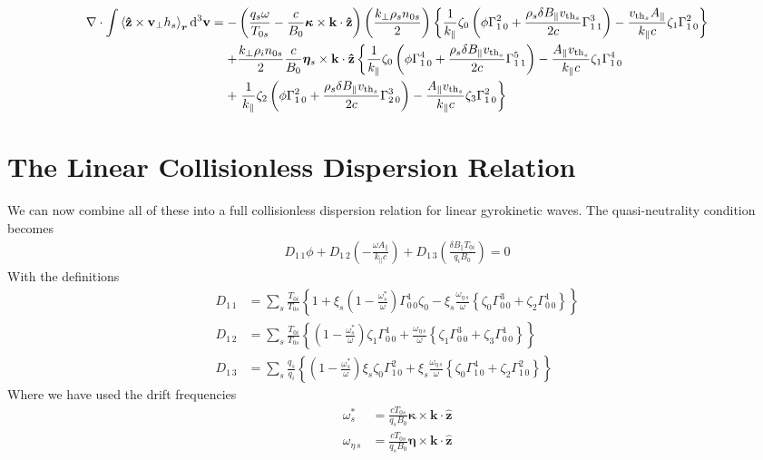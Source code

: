 \documentclass[prb,aps,amssymb,amsmath,a4paper]{revtex4}
\begin{document}
\begin{align}
\nonumber
\nabla\cdot\int {\left< \mathbf{\hat{z}}\times\mathbf{v}_\perp h_s \right>}_{\bm{r}}\,\mathrm{d}^3\mathbf{v}= -& \left(\frac{q_s\omega}{T_{0s}} - \frac{c}{B_0} \bm{\kappa}\times\mathbf{k}\cdot\mathbf{\hat{z}}\right)\left(\frac{k_\perp \rho_s n_{0s}}{2}\right)\left\{ \frac{1}{k_\parallel}\zeta_0\left(\phi \Gamma^{2}_{1\,0}  + \frac{\rho_s \delta B_\parallel v_{\mathrm{th}_s}}{2 c} \Gamma^{3}_{1\,1}\right) - \frac{v_{\mathrm{th}_s} A_\parallel}{k_\parallel c} \zeta_1 \Gamma^{2}_{1\,0} \right\}
\\ \nonumber
+& \frac{k_\perp\rho_i n_{0s}}{2} \frac{c}{B_0} \bm{\eta}_s\times\mathbf{k}\cdot\mathbf{\hat{z}}\left\{ \frac{1}{k_\parallel} \zeta_0 \left( \phi \Gamma^{4}_{1\,0}+ \frac{\rho_s \delta B_\parallel v_{\mathrm{th}_s}}{2 c} \Gamma^{5}_{1\,1} \right) - \frac{A_\parallel v_{\mathrm{th}_s}}{k_\parallel c} \zeta_1 \Gamma^{4}_{1\,0}\right. \\
		\nonumber +& \left. \frac{1}{k_\parallel} \zeta_2 \left(\phi \Gamma^{2}_{1\,0} + \frac{\rho_s \delta B_\parallel v_{\mathrm{th}_s}}{2 c} \Gamma^{3}_{2\,0} \right) - \frac{A_\parallel v_{\mathrm{th}_s}}{k_\parallel c} \zeta_3\Gamma^{2}_{1\,0}\right\}
\end{align}

\section{The Linear Collisionless Dispersion Relation}
We can now combine all of these into a full collisionless dispersion relation for linear gyrokinetic waves. The quasi-neutrality condition becomes
\begin{align}
\nonumber
D_{1\,1} \phi + D_{1\,2} \left(-\frac{\omega A_\parallel}{k_\parallel c}\right) + D_{1\,3} \left(\frac{\delta B_\parallel T_{0i}}{q_i B_0}\right) = 0
\end{align}
With the definitions
\begin{align}
\nonumber
D_{1\,1} &= \sum\limits_s \frac{T_{0i}}{T_{0s}}\left\{1 + \xi_s \left( 1 - \frac{\omega^{*}_s}{\omega} \right) \Gamma^{1}_{0\,0} \zeta_0 -\xi_s \frac{\omega_{\eta\,s}}{\omega} \left\{ \zeta_0 \Gamma^{3}_{0\,0} + \zeta_2 \Gamma^{1}_{0\,0} \right\} \right\}
\\ \nonumber
D_{1\,2} &= \sum\limits_s \frac{T_{0i}}{T_{0s}} \left\{ \left(1 - \frac{\omega^{*}_s}{\omega}\right) \zeta_1 \Gamma^{1}_{0\,0} + \frac{\omega_{\eta\,s}}{\omega}\left\{ \zeta_1 \Gamma^{3}_{0\,0} + \zeta_3 \Gamma^{1}_{0\,0}\right\}\right\}
\\ \nonumber
D_{1\,3} &= \sum\limits_s \frac{q_s}{q_i} \left\{ \left( 1- \frac{\omega^{*}_s}{\omega}\right)\xi_s \zeta_0 \Gamma^{2}_{1\,0} + \xi_s \frac{\omega_{\eta\,s}}{\omega} \left\{ \zeta_0 \Gamma^{4}_{1\,0} + \zeta_2 \Gamma^{2}_{1\,0} \right\}  \right\}
\end{align}
Where we have used the drift frequencies
\begin{align}
\omega^{*}_s&= \frac{c T_{0s}}{q_s B_0} \bm{\kappa} \times \mathbf{k} \cdot \mathbf{\hat{z}}
\\
\omega_{\eta\,s} &= \frac{c T_{0s}}{q_s B_0} \bm{\eta} \times \mathbf{k} \cdot \mathbf{\hat{z}}
\end{align}
\end{document}
